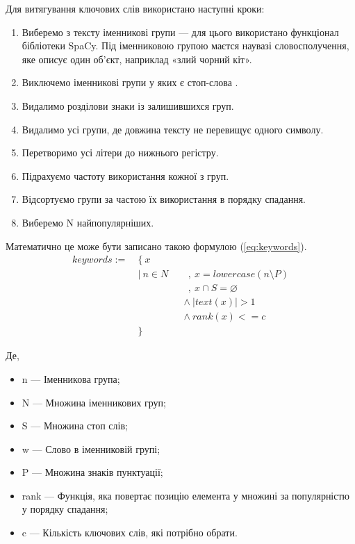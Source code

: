 \documentclass[14pt]{extarticle}
\begin{document}
  Для витягування ключових слів використано наступні кроки:
  \begin{enumerate}[labelindent=\dimexpr\parindent*2\relax, leftmargin=*]
    \item Виберемо з тексту іменникові групи ---
      для цього використано функціонал бібліотеки SpaCy.
      Під іменниковою групою маєтся наувазі словосполучення,
      яке описує один об'єкт, наприклад «злий чорний кіт».
    \item Виключемо іменникові групи у яких є стоп-слова \cite{wiki_stop_word}.
    \item Видалимо розділови знаки із залишившихся груп.
    \item Видалимо усі групи, де довжина тексту не перевищує одного символу.
    \item Перетворимо усі літери до нижнього регістру.
    \item Підрахуємо частоту використання кожної з груп.
    \item Відсортуємо групи за частою їх використання в порядку спадання.
    \item Виберемо N найпопулярніших.
  \end{enumerate}

  Математично це може бути записано такою формулою (\ref{eq:keywords}).
  \begin{equation}
    \begin{alignedat}{2}
     keywords := ~&\{~ x \\
                  &|~ n \in N &&~~,  ~ x = lowercase(n \setminus P) \\
                  &           &&~~,  ~ x \cap S = \varnothing \\
                  &           &&\land~ | text(x) | > 1 \\
                  &           &&\land~ rank(x) <= c \\
                  &\}
    \end{alignedat}
    \label{eq:keywords}
  \end{equation}

  Де,
  \begin{itemize}[labelindent=\dimexpr{}\relax, leftmargin=*]
    \item n --- Іменникова група;
    \item N --- Множина іменникових груп;
    \item S --- Множина стоп слів;
    \item w --- Слово в іменниковій групі;
    \item P --- Множина знаків пунктуації;
    \item rank --- Функція,
      яка повертає позицію елемента у множині за популярністю
      у порядку спадання;
    \item c --- Кількість ключових слів, які потрібно обрати.
  \end{itemize}
\end{document}
